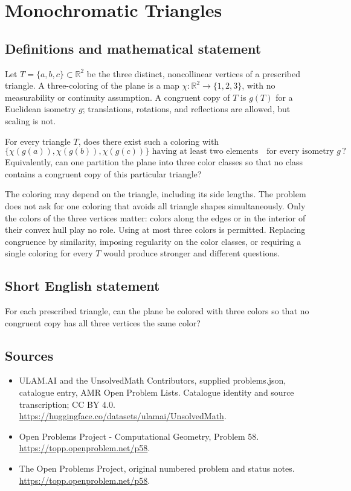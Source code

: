 \documentclass[11pt,a4paper]{article}
\begin{document}
\section*{Monochromatic Triangles}\label{statement}

\subsection{Definitions and mathematical statement}
Let $T=\{a,b,c\}\subset\mathbb R^2$ be the three distinct,
noncollinear vertices of a prescribed triangle. A three-coloring
of the plane is a map $\chi:\mathbb R^2\to\{1,2,3\}$, with no
measurability or continuity assumption. A congruent copy of $T$
is $g(T)$ for a Euclidean isometry $g$; translations, rotations,
and reflections are allowed, but scaling is not.

For every triangle $T$, does there exist such a coloring with
\[
             \{\chi(g(a)),\chi(g(b)),\chi(g(c))\}
                     \text{ having at least two elements}
                 \quad\text{for every isometry }g\,?
\]
Equivalently, can one partition the plane into three color
classes so that no class contains a congruent copy of this
particular triangle?

The coloring may depend on the triangle, including its side
lengths. The problem does not ask for one coloring that avoids
all triangle shapes simultaneously. Only the colors of the
three vertices matter: colors along the edges or in the
interior of their convex hull play no role. Using at most three
colors is permitted. Replacing congruence by similarity, imposing
regularity on the color classes, or requiring a single coloring
for every $T$ would produce stronger and different questions.
\subsection{Short English statement}
For each prescribed triangle, can the plane be colored with three colors so that no congruent copy has all three vertices the same color?
\subsection{Sources}
\begin{itemize}
\item[S1] ULAM.AI and the UnsolvedMath Contributors, supplied problems.json, catalogue entry, AMR Open Problem Lists. Catalogue identity and source transcription; CC BY 4.0.
\url{https://huggingface.co/datasets/ulamai/UnsolvedMath}.
\item[S2] Open Problems Project - Computational Geometry, Problem 58. 
\url{https://topp.openproblem.net/p58}.
\item[S3] The Open Problems Project, original numbered problem and status notes.
\url{https://topp.openproblem.net/p58}.
\end{itemize}
\end{document}

